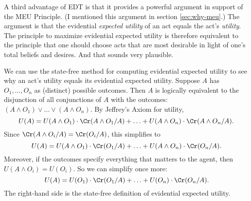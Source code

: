 
A third advantage of EDT is that it provides a powerful argument in support of
the MEU Principle. (I mentioned this argument in section \ref{sec:why-meu}.) The
argument is that the evidential \emph{expected utility} of an act equals the
act's \emph{utility}. The principle to maximize evidential expected utility is
therefore equivalent to the principle that one should choose acts that are most
desirable in light of one's total beliefs and desires. And that sounds very
plausible.

We can use the state-free method for computing evidential expected utility to
see why an act's utility equals its evidential expected utility. Suppose $A$ has
$O_1,\ldots, O_n$ as (distinct) possible outcomes. Then $A$ is logically
equivalent to the disjunction of all conjunctions of $A$ with the outcomes:
$(A \land O_1) \lor \ldots \lor (A \land O_n)$.
By Jeffrey's Axiom for utility,
\[
U(A) = U(A\land O_1) \cdot \Cr(A \land O_1/A) + \ldots +
       U(A\land O_n) \cdot \Cr(A \land O_n/A).
\]
Since $\Cr(A \land O_i/A) = \Cr(O_i/A)$, this simplifies to
\[
U(A) = U(A\land O_1) \cdot \Cr(O_1/A) + \ldots +
       U(A\land O_n) \cdot \Cr(O_n/A).
\]
Moreover, if the outcomes specify everything that matters to the
agent, then $U(A \land O_i) = U(O_i)$. So we can simplify once more:
\[
U(A) = U(O_1) \cdot \Cr(O_1/A) + \ldots + U(O_n) \cdot \Cr(O_n/A).
\]
The right-hand side is the state-free definition of evidential expected utility.


